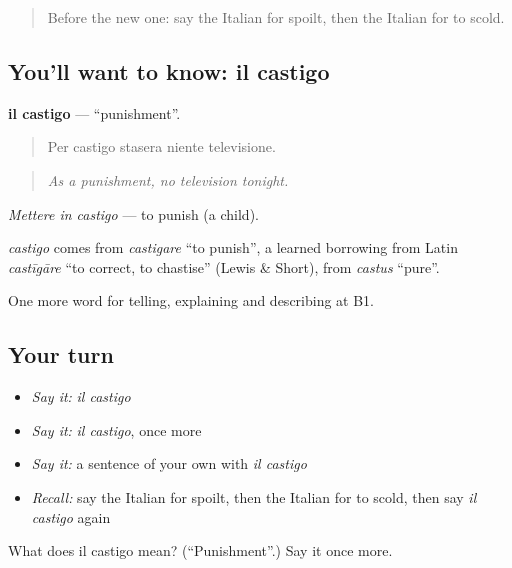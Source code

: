 \label{lesson:IT-C497-castigo}



\begin{quote}
Before the new one: say the Italian for spoilt, then the Italian for to scold.
\end{quote}

\subsection*{You'll want to know: il castigo}
\textbf{il castigo} — \textquotedblleft{}punishment\textquotedblright{}.

\begin{quote}
Per castigo stasera niente televisione.
\end{quote}

\begin{quote}
\emph{As a punishment, no television tonight.}
\end{quote}

\emph{Mettere in castigo} — to punish (a child).

\begin{cousinweb}
\emph{castigo} comes from \emph{castigare} \textquotedblleft{}to punish\textquotedblright{}, a learned borrowing from Latin \emph{castīgāre} \textquotedblleft{}to correct, to chastise\textquotedblright{} (Lewis \& Short), from \emph{castus} \textquotedblleft{}pure\textquotedblright{}.
\end{cousinweb}

\begin{grammarlens}[title={What you've built}]
One more word for telling, explaining and describing at B1.
\end{grammarlens}

\subsection*{Your turn}
\begin{itemize}
\raggedright
  \item \emph{Say it:} \emph{il castigo}
  \item \emph{Say it:} \emph{il castigo}, once more
  \item \emph{Say it:} a sentence of your own with \emph{il castigo}
  \item \emph{Recall:} say the Italian for spoilt, then the Italian for to scold, then say \emph{il castigo} again
\end{itemize}

\begin{tcolorbox}[breakable,colback=teal!4,colframe=teal!35!black,title={Before you move on}]
What does il castigo mean? (\textquotedblleft{}Punishment\textquotedblright{}.) Say it once more.
\end{tcolorbox}
